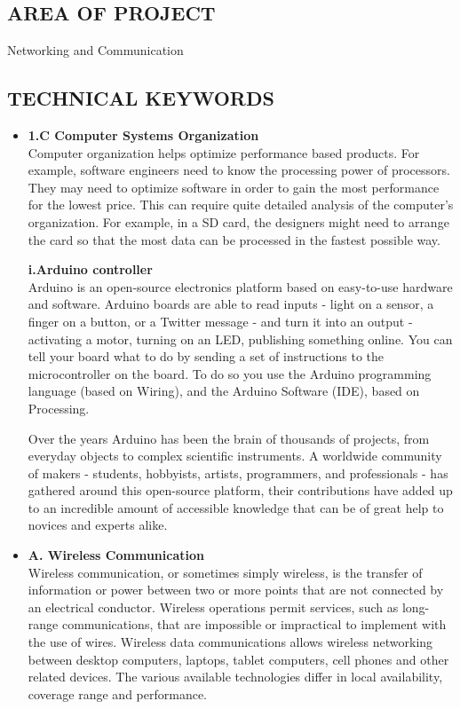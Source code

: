 \documentclass[12pt,a4paper]
{article}
\numberwithin{table}{section}
\begin{document}
{{{ \vspace{0.5 in}
\subsection{AREA OF PROJECT}
Networking and Communication 
	\begin{flushleft}
\subsection{TECHNICAL KEYWORDS}	

	
			\begin{itemize}
			
		
			
				\item \textbf{1.C  Computer Systems Organization} \\
				Computer organization helps optimize performance based products. For example, software engineers need to know the processing power of processors. They may need to optimize software in order to gain the most performance for the lowest price. This can require quite detailed analysis of the computer's organization. For example, in a SD card, the designers might need to arrange the card so that the most data can be processed in the fastest possible way.


				\textbf{ i.Arduino controller} \\
				Arduino is an open-source electronics platform based on easy-to-use hardware and software. Arduino boards are able to read inputs - light on a sensor, a finger on a button, or a Twitter message - and turn it into an output - activating a motor, turning on an LED, publishing something online. You can tell your board what to do by sending a set of instructions to the microcontroller on the board. To do so you use the Arduino programming language (based on Wiring), and the Arduino Software (IDE), based on Processing.

Over the years Arduino has been the brain of thousands of projects, from everyday objects to complex scientific instruments. A worldwide community of makers - students, hobbyists, artists, programmers, and professionals - has gathered around this open-source platform, their contributions have added up to an incredible amount of accessible knowledge that can be of great help to novices and experts alike.
			   \item \textbf{A. Wireless Communication} \\
			    Wireless communication, or sometimes simply wireless, is the transfer of information or power between two or more points that are not connected by an electrical conductor. Wireless operations permit services, such as long-range communications, that are impossible or impractical to implement with the use of wires. Wireless data communications allows wireless networking between desktop computers, laptops, tablet computers, cell phones and other related devices. The various available technologies differ in local availability, coverage range and performance.
		

\end{itemize}
\end{flushleft}}}}
\end{document}
